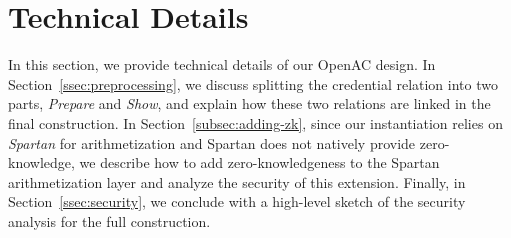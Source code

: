 \documentclass{article}
\newcommand{\jbel}[1]{{\color{blue}{}jbel: #1}}
\begin{document}
        

\section{Technical Details}\label{sec:contribution}
In this section, we provide technical details of our OpenAC design.
In Section~\ref{ssec:preprocessing}, we discuss splitting the credential relation into two parts, \emph{Prepare} and \emph{Show}, and explain how these two relations are linked in the final construction. 
In Section~\ref{subsec:adding-zk}, since our instantiation relies on \emph{Spartan} for arithmetization and Spartan does not natively provide zero-knowledge, we describe how to add zero-knowledgeness to the Spartan arithmetization layer and analyze the security of this extension.
Finally, in Section~\ref{ssec:security}, we conclude with a high-level sketch of the security analysis for the full construction.
\end{document}
